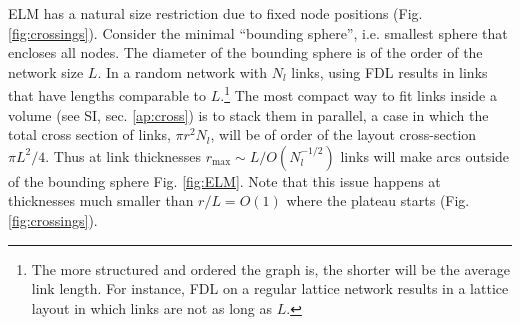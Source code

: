 \documentclass[nofootinbib,preprint,floatfix,endfloats]{revtex4} %
\begin{document}
ELM has a natural size restriction due to fixed node positions (Fig. \ref{fig:crossings}).
Consider the minimal ``bounding sphere'', i.e. smallest sphere that encloses all nodes. 
The diameter of the bounding sphere is of the order of the network size $L$. 
In a random network with $N_l$ links, using FDL results in links that have lengths comparable to $L$.\footnote{The more structured and ordered the graph is, the shorter will be the average link length. 
For instance, FDL on a regular lattice network results in a lattice layout in which links are not as long as $L$.} 
The most compact way to fit links inside a volume (see SI, sec. \ref{ap:cross}) is to stack them in parallel, a case in which the total cross section of links, $\pi r^2 N_l$, will be of order of the layout cross-section $\pi L^2/4$. 
Thus at link thicknesses $r_\mathrm{max} \sim L/O(N_l^{-1/2})$ links will make arcs outside of the bounding sphere %
Fig. \ref{fig:ELM}. Note that this issue happens at thicknesses much smaller than $r/L = O(1)$ where the plateau starts (Fig. \ref{fig:crossings}).  
\end{document}
